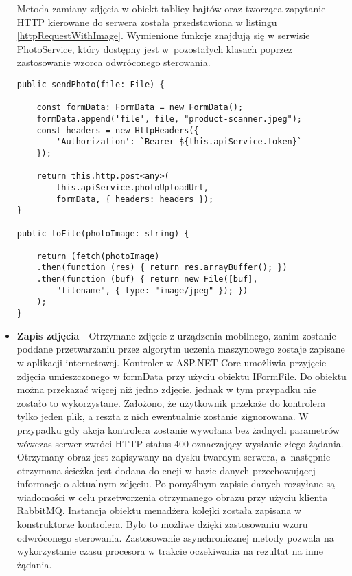 \begin{itemize}
Metoda zamiany zdjęcia w obiekt tablicy bajtów oraz tworząca zapytanie HTTP kierowane do serwera została przedstawiona w listingu \ref{httpRequestWithImage}. Wymienione funkcje znajdują się w serwisie PhotoService, który dostępny jest w~pozostałych klasach poprzez zastosowanie wzorca odwróconego sterowania.

\begin{lstlisting}[caption={Zamiana base64 na tablicę bajtów oraz przesłanie zdjęcia przy użyciu obiektu form data.},label={httpRequestWithImage}]
public sendPhoto(file: File) {

	const formData: FormData = new FormData();
	formData.append('file', file, "product-scanner.jpeg");
	const headers = new HttpHeaders({
		'Authorization': `Bearer ${this.apiService.token}`
	});
	
	return this.http.post<any>(
		this.apiService.photoUploadUrl, 
		formData, { headers: headers });
}

public toFile(photoImage: string) {

	return (fetch(photoImage)
	.then(function (res) { return res.arrayBuffer(); })
	.then(function (buf) { return new File([buf], 
		"filename", { type: "image/jpeg" }); })
	);
}
\end{lstlisting} 
\item \textbf{Zapis zdjęcia} - Otrzymane zdjęcie z urządzenia mobilnego, zanim zostanie poddane przetwarzaniu przez algorytm uczenia maszynowego zostaje zapisane w aplikacji internetowej. Kontroler w ASP.NET Core umożliwia przyjęcie zdjęcia umieszczonego w formData przy użyciu obiektu IFormFile. Do obiektu można przekazać więcej niż jedno zdjęcie, jednak w tym przypadku nie zostało to wykorzystane. Założono, że użytkownik przekaże do kontrolera tylko jeden plik, a reszta z nich ewentualnie zostanie zignorowana. W przypadku gdy akcja kontrolera zostanie wywołana bez żadnych parametrów wówczas serwer zwróci HTTP status 400 oznaczający wysłanie złego żądania. Otrzymany obraz jest zapisywany na dysku twardym serwera, a~następnie otrzymana ścieżka jest dodana do encji w bazie danych przechowującej informacje o aktualnym zdjęciu. Po pomyślnym zapisie danych rozsyłane są wiadomości w celu przetworzenia otrzymanego obrazu przy użyciu klienta RabbitMQ. Instancja obiektu menadżera kolejki została zapisana w konstruktorze kontrolera. Było to możliwe dzięki zastosowaniu wzoru odwróconego sterowania. Zastosowanie asynchronicznej metody pozwala na wykorzystanie czasu procesora w trakcie oczekiwania na rezultat na inne żądania. 


\end{itemize}
